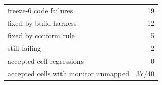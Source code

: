 \begin{tabular}{lr}
\toprule
freeze-6 code failures & 19 \\
fixed by build harness & 12 \\
fixed by conform rule & 5 \\
still failing & 2 \\
accepted-cell regressions & 0 \\
accepted cells with monitor unmapped & 37/40 \\
\bottomrule
\end{tabular}
